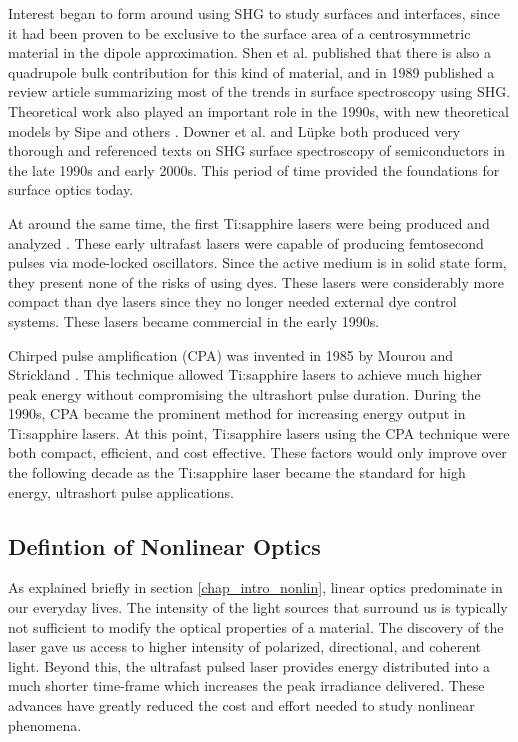 Interest began to form around using SHG to study surfaces and interfaces, since it had been proven \cite{PhysRevLett.46.145} to be exclusive to the surface area of a centrosymmetric material in the dipole approximation. Shen et al. published \cite{PhysRevB.38.7985} that there is also a quadrupole bulk contribution for this kind of material, and in 1989 \cite{shen89nature} published a review article summarizing most of the trends in surface spectroscopy using SHG. Theoretical work also played an important role in the 1990s, with new theoretical models by Sipe \cite{PhysRevB.53.10751} and others \cite{PhysRevB.53.4999, PhysRevB.60.14334, PhysRevB.55.2489, PhysRevB.57.2569}. Downer et al. \cite{downer2001optical} and L\"upke \cite{Lupke199975} both produced very thorough and referenced texts on SHG surface spectroscopy of semiconductors in the late 1990s and early 2000s. This period of time provided the foundations for surface optics today.

At around the same time, the first Ti:sapphire lasers were being produced and analyzed \cite{Moulton:86}. These early ultrafast lasers were capable of producing femtosecond pulses via mode-locked oscillators. Since the active medium is in solid state form, they present none of the risks of using dyes. These lasers were considerably more compact than dye lasers since they no longer needed external dye control systems. These lasers became commercial in the early 1990s.

Chirped pulse amplification (CPA) was invented in 1985 by Mourou and Strickland \cite{Strickland1985447}. This technique allowed Ti:sapphire lasers to achieve much higher peak energy without compromising the ultrashort pulse duration. During the 1990s, CPA became the prominent method for increasing energy output in Ti:sapphire lasers. At this point, Ti:sapphire lasers using the CPA technique were both compact, efficient, and cost effective. These factors would only improve over the following decade as the Ti:sapphire laser became the standard for high energy, ultrashort pulse applications.

\subsection{Defintion of Nonlinear Optics}
As explained briefly in section \ref{chap_intro_nonlin}, linear optics predominate in our everyday lives. The intensity of the light sources that surround us is typically not sufficient to modify the optical properties of a material. The discovery of the laser gave us access to higher intensity of polarized, directional, and coherent light. Beyond this, the ultrafast pulsed laser provides energy distributed into a much shorter time-frame which increases the peak irradiance delivered. These advances have greatly reduced the cost and effort needed to study nonlinear phenomena.


